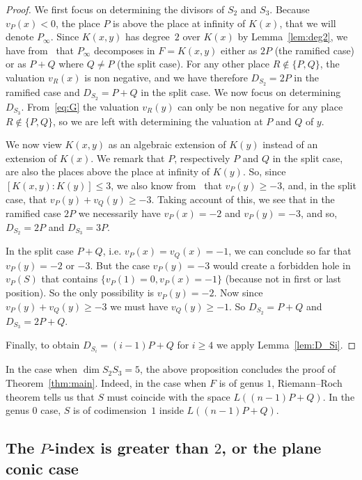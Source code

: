 \documentclass[ALCO,Unicode,ThmDefs]{cedram}
\renewcommand{\geq}{\geqslant}
\renewcommand{\leq}{\leqslant}
\begin{document}
\begin{proof}
We first focus on determining the divisors of $S_2$ and $S_3$. Because $v_P(x)<0$, the place $P$ is above the place at infinity of $K(x)$, that we will denote $P_\infty$. Since $K(x,y)$ has degree~$2$ over $K(x)$ by Lemma~\ref{lem:deg2}, we have from~\cite[Chapter~3]{Stichtenoth} that $P_{\infty}$ decomposes in $F=K(x,y)$ either as $2P$ (the ramified case) or as $P+Q$ where $Q\neq P$ (the split case). For any other place $R\notin\{P, Q\}$, the valuation $v_R(x)$ is non negative, and we have therefore $D_{S_2}=2P$ in the ramified case and $D_{S_2}=P+Q$ in the split case. We now focus on determining $D_{S_3}$. From~\eqref{eq:G} the valuation $v_R(y)$ can only be non negative for any place $R \notin\{P, Q\}$, so we are left with determining the valuation at $P$ and $Q$ of $y$.

We now view $K(x,y)$ as an algebraic extension of $K(y)$ instead of an extension of $K(x)$. We remark that $P$, respectively $P$ and $Q$ in the split case, are also the places above the place at infinity of $K(y)$. So, since $[K(x,y):K(y)]\leq3$, we also know from~\cite[Chapter~3]{Stichtenoth} that $v_P(y)\geq-3$, and, in the split case, that $v_P(y)+v_Q(y)\geq-3$. Taking account of this, we see that in the ramified case $2P$ we necessarily have $v_P(x)=-2$ and $v_P(y)=-3$, and so, $D_{S_2}=2P$ and $D_{S_3}=3P$.

In the split case $P+Q$, i.e. $v_P(x)=v_Q(x)=-1$, we can conclude so far that $v_P(y)=-2$ or $-3$. But the case $v_P(y)=-3$ would create a forbidden hole in $v_P(S)$ that contains $\{v_P(1)=0,v_P(x)=-1\}$ (because not in first or last position). So the only possibility is $v_P(y)=-2$. Now since $v_P(y)+v_Q(y)\geq-3$ we must have $v_Q(y)\geq-1$. So $D_{S_2}=P+Q$ and $D_{S_3}=2P+Q$.

Finally, to obtain $D_{S_i}=(i-1)P+Q$ for $i\geq4$ we apply Lemma~\ref{lem:D_Si}.
\end{proof}

In the case when $\dim S_2S_3=5$, the above proposition concludes the proof of Theorem~\ref{thm:main}. Indeed, in the case when $F$ is of genus $1$, Riemann--Roch theorem tells us that $S$ must coincide with the space $L((n-1)P+Q)$. In the genus $0$ case, $S$ is of codimension~$1$ inside $L((n-1)P+Q)$.

\subsection{The \texorpdfstring{$P$}{P}-index is greater than \texorpdfstring{$2$}{2}, or the plane conic case}\label{sec:Pindex>2}
\end{document}
